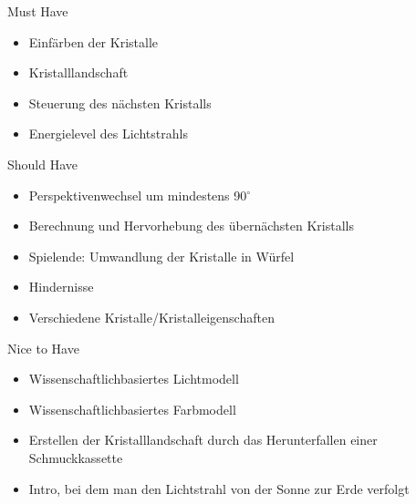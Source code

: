 \slideonetoone
{Must Have}
{
	\begin{itemize}
		\item Einfärben der Kristalle
		\item Kristalllandschaft
		\item Steuerung des nächsten Kristalls
		\item Energielevel des Lichtstrahls
	\end{itemize}
}
{
	
}

\slideonetoone
{Should Have}
{
	\begin{itemize}
		\item Perspektivenwechsel um mindestens 90$^\circ$
		\item Berechnung und Hervorhebung des übernächsten Kristalls
		\item Spielende: Umwandlung der Kristalle in Würfel
		\item Hindernisse
		\item Verschiedene Kristalle/Kristalleigenschaften
	\end{itemize}
}
{
	
}

\slideonetoone
{Nice to Have}
{
	\begin{itemize}
		\item Wissenschaftlichbasiertes Lichtmodell 
		\item Wissenschaftlichbasiertes Farbmodell
		\item Erstellen der Kristalllandschaft durch das Herunterfallen einer Schmuckkassette
		\item Intro, bei dem man den Lichtstrahl von der Sonne zur Erde verfolgt
	\end{itemize}
}
{
	
}

%


